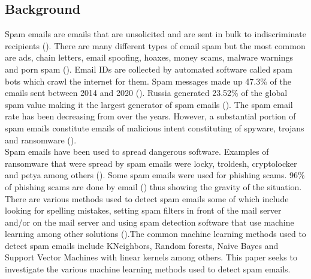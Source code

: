\subsection{Background}
Spam emails are emails that are unsolicited and are sent in bulk to indiscriminate recipients (\cite{comodo_2021}). There are many different types of email spam but the most common are ads, chain letters, email spoofing, hoaxes, money scams, malware warnings and porn spam (\cite{gatefy_2021}). Email IDs are collected by automated software called spam bots which crawl the internet for them. Spam messages made up 47.3\% of the emails sent between 2014 and 2020 (\cite{johnson_2021}). Russia generated 23.52\%  of the global spam value making it the largest generator of spam emails (\cite{johnson_2021}). The spam email rate has been decreasing from over the years. However, a substantial portion of spam emails constitute emails of malicious intent constituting of spyware, trojans and ransomware (\cite{johnson_2021}).\\
Spam emails have been used to spread dangerous software. Examples of ransomware that were spread by spam emails were locky, troldesh, cryptolocker and petya among others (\cite{kaspersky_2021}). Some spam emails were used for phishing scams. 96\% of phishing scams are done by email (\cite{verizon}) thus showing the gravity of the situation.
\\
There are various methods used to detect spam emails some of which include looking for spelling mistakes, setting spam filters in front of the mail server and/or on the mail server and using spam detection software that use machine learning among other solutions (\cite{wikipedia_2021_email}).The common machine learning methods used to detect spam emails include KNeighbors, Random forests, Naive Bayes and Support Vector Machines with linear kernels among others. This paper seeks to investigate the various machine learning methods used to detect spam emails.